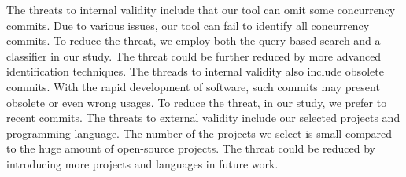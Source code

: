 The threats to internal validity include that our tool can omit some concurrency commits. Due to various issues, our tool can fail to identify all concurrency commits. To reduce the threat, we employ both the query-based search and a classifier in our study. The threat could be further reduced by more advanced identification techniques. The threads to internal validity also include obsolete commits. With the rapid development of software, such commits may present obsolete or even wrong usages. To reduce the threat, in our study, we prefer to recent commits. The threats to external validity include our selected projects and programming language. The number of the projects we select is small compared to the huge amount of open-source projects. The threat could be reduced by introducing more projects and languages in future work.


